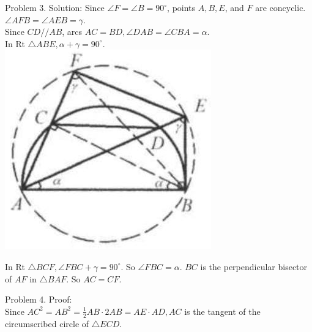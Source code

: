 \documentclass[10pt]{article}
\begin{document}
Problem 3. Solution:
Since \(\angle F=\angle B=90^{\circ}\), points \(A, B, E\), and \(F\) are concyclic.\\
\(\angle A F B=\angle A E B=\gamma\).\\
Since \(C D / / A B\), arcs \(A C=B D, \angle D A B=\angle C B A=\alpha\).\\
In Rt \(\triangle A B E, \alpha+\gamma=90^{\circ}\).\\
\includegraphics[max width=\textwidth, center]{2025_04_17_97bc1f7e44d93c271a88g-209}

In Rt \(\triangle B C F, \angle F B C+\gamma=90^{\circ}\). So \(\angle F B C=\alpha\). \(B C\) is the perpendicular bisector of \(A F\) in \(\triangle B A F\). So \(A C=C F\).

Problem 4. Proof:\\
Since \(A C^{2}=A B^{2}=\frac{1}{2} A B \cdot 2 A B=A E \cdot A D, A C\) is the tangent of the circumscribed circle of \(\triangle E C D\).
\end{document}
